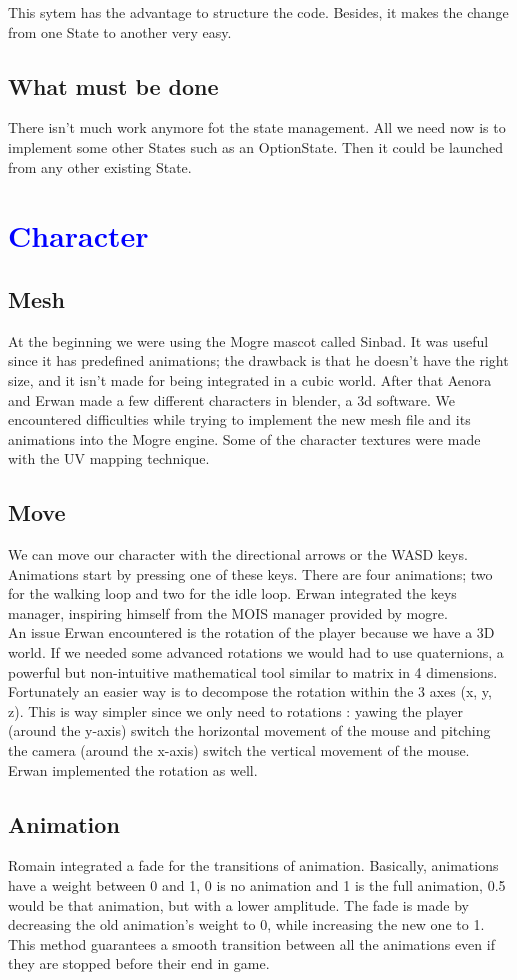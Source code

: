\documentclass[article]{report} %
\begin{document}
This sytem has the advantage to structure the code. Besides, it makes the change from one State to another very easy.
			\section{What must be done}
				There isn't much work anymore fot the state management. All we need now is to implement some other States such as an OptionState. Then it could be launched from any other existing State.
				

		\chapter{\textcolor{blue}{Character}}
			\section{Mesh}
				At the beginning we were using the Mogre mascot called Sinbad. It was useful since it has predefined animations; the drawback is that he doesn't have the right size, and it isn't made for being integrated in a cubic world. After that Aenora and Erwan made a few different characters in blender, a 3d software. We encountered difficulties while trying to implement the new mesh file and its animations into the Mogre engine. Some of the character textures were made with the UV mapping technique.
			\section{Move}
				We can move our character with the directional arrows or the WASD keys. Animations start by pressing one of these keys. There are four animations; two for the walking loop and two for the idle loop. Erwan integrated the keys manager, inspiring himself from the MOIS manager provided by mogre.\\

An issue Erwan encountered is the rotation of the player because we have a 3D world. If we needed some advanced rotations we would had to use quaternions, a powerful but non-intuitive mathematical tool similar to matrix in 4 dimensions. Fortunately an easier way is to decompose the rotation within the 3 axes (x, y, z). This is way simpler since we only need to rotations : yawing the player (around the y-axis) switch the horizontal movement of the mouse and pitching the camera (around the x-axis) switch the vertical movement of the mouse. Erwan implemented the rotation as well.
			\section{Animation}
				Romain integrated a fade for the transitions of animation. Basically, animations have a weight between 0 and 1, 0 is no animation and 1 is the full animation, 0.5 would be that animation, but with a lower amplitude. The fade is made by decreasing the old animation's weight to 0, while increasing the new one to 1. This method guarantees a smooth transition between all the animations even if they are stopped before their end in game.
\end{document}
